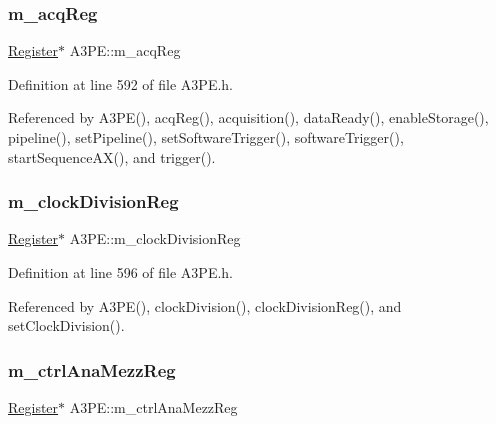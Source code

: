 \subsubsection{\texorpdfstring{m\+\_\+acq\+Reg}{m\_acqReg}}
{\footnotesize\ttfamily \hyperlink{classRegister}{Register}$\ast$ A3\+P\+E\+::m\+\_\+acq\+Reg\hspace{0.3cm}{\ttfamily [private]}}



Definition at line 592 of file A3\+P\+E.\+h.



Referenced by A3\+P\+E(), acq\+Reg(), acquisition(), data\+Ready(), enable\+Storage(), pipeline(), set\+Pipeline(), set\+Software\+Trigger(), software\+Trigger(), start\+Sequence\+A\+X(), and trigger().

\mbox{\label{classA3PE_ae1f4c24a99c2e6ae944a080f429cc155}} 
\subsubsection{\texorpdfstring{m\+\_\+clock\+Division\+Reg}{m\_clockDivisionReg}}
{\footnotesize\ttfamily \hyperlink{classRegister}{Register}$\ast$ A3\+P\+E\+::m\+\_\+clock\+Division\+Reg\hspace{0.3cm}{\ttfamily [private]}}



Definition at line 596 of file A3\+P\+E.\+h.



Referenced by A3\+P\+E(), clock\+Division(), clock\+Division\+Reg(), and set\+Clock\+Division().

\mbox{\label{classA3PE_a126a936a5fd4fd4b83485b3637e1fa84}} 
\subsubsection{\texorpdfstring{m\+\_\+ctrl\+Ana\+Mezz\+Reg}{m\_ctrlAnaMezzReg}}
{\footnotesize\ttfamily \hyperlink{classRegister}{Register}$\ast$ A3\+P\+E\+::m\+\_\+ctrl\+Ana\+Mezz\+Reg\hspace{0.3cm}{\ttfamily [private]}}



